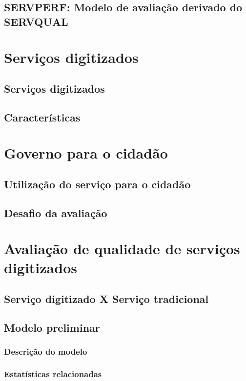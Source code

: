 \subsection{SERVPERF: Modelo de avaliação derivado do SERVQUAL}
\subsubsection{}


\section{Serviços digitizados}
\subsection{Serviços digitizados}
\subsection{Características}

\section{Governo para o cidadão}
\subsection{Utilização do serviço para o cidadão}
\subsection{Desafio da avaliação}

\section{Avaliação de qualidade de serviços digitizados}
\subsection{Serviço digitizado X Serviço tradicional}
\subsection{Modelo preliminar}
\subsubsection{Descrição do modelo}
\subsubsection{Estatísticas relacionadas}